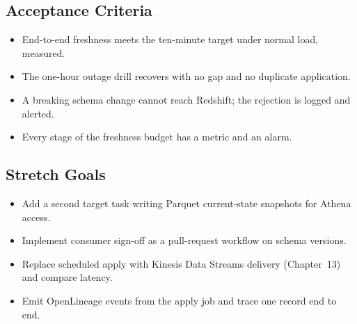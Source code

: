 \subsection*{Acceptance Criteria}
\begin{itemize}
    \item End-to-end freshness meets the ten-minute target under normal load, measured.
    \item The one-hour outage drill recovers with no gap and no duplicate application.
    \item A breaking schema change cannot reach Redshift; the rejection is logged and alerted.
    \item Every stage of the freshness budget has a metric and an alarm.
\end{itemize}

\subsection*{Stretch Goals}
\begin{itemize}
    \item Add a second target task writing Parquet current-state snapshots for Athena access.
    \item Implement consumer sign-off as a pull-request workflow on schema versions.
    \item Replace scheduled apply with Kinesis Data Streams delivery (Chapter~13) and compare latency.
    \item Emit OpenLineage events from the apply job and trace one record end to end.
\end{itemize}
